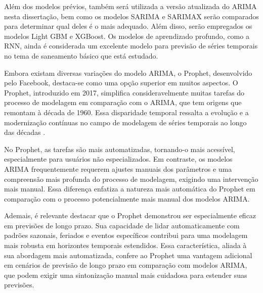Além dos modelos prévios, também será utilizada a versão atualizada do ARIMA nesta dissertação, bem como os modelos SARIMA e SARIMAX serão comparados para determinar qual deles é o mais adequado. Além disso, serão empregados os modelos Light GBM e XGBoost. Os modelos de aprendizado profundo, como a RNN, ainda é considerada um excelente modelo para previsão de séries temporais no tema de saneamento básico que está estudado.

Embora existam diversas variações do modelo ARIMA, o Prophet, desenvolvido pelo Facebook, destaca-se como uma opção superior em muitos aspectos. O Prophet, introduzido em 2017, simplifica consideravelmente muitas tarefas do processo de modelagem em comparação com o ARIMA, que tem origens que remontam à década de 1960. Essa disparidade temporal ressalta a evolução e a modernização contínuas no campo de modelagem de séries temporais ao longo das décadas \cite{ramos2010previsoes}.

No Prophet, as tarefas são mais automatizadas, tornando-o mais acessível, especialmente para usuários não especializados. Em contraste, os modelos ARIMA frequentemente requerem ajustes manuais dos parâmetros e uma compreensão mais profunda do processo de modelagem, exigindo uma intervenção mais manual. Essa diferença enfatiza a natureza mais automática do Prophet em comparação com o processo potencialmente mais manual dos modelos ARIMA.

Ademais, é relevante destacar que o Prophet demonstrou ser especialmente eficaz em previsões de longo prazo. Sua capacidade de lidar automaticamente com padrões sazonais, feriados e eventos específicos contribui para uma modelagem mais robusta em horizontes temporais estendidos. Essa característica, aliada à sua abordagem mais automatizada, confere ao Prophet uma vantagem adicional em cenários de previsão de longo prazo em comparação com modelos ARIMA, que podem exigir uma sintonização manual mais cuidadosa para estender suas previsões.
